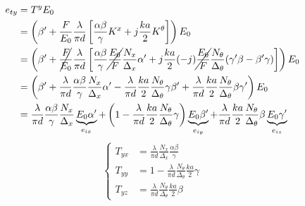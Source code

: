 \begin{align*}
    e_{ty} &= T^y E_0
    \\
    &=
    \left(
        \beta'
        +
        \frac{F}{E_0}
        \frac{\lambda}{\pi d}
        \left[
            \frac{\alpha \beta}{\gamma}
            K^x
            +
            j
            \frac{ka}{2}
            K^\theta
        \right]
    \right)
    E_0
    \\
    &=
    \left(
        \beta'
        +
        \cancel{\frac{F}{E_0}}
        \frac{\lambda}{\pi d}
        \left[
            \frac{\alpha \beta}{\gamma}
            \cancel{\frac{E_0}{F}}
            \frac{N_x}{\Delta_x}
            \alpha'
            +
            j
            \frac{ka}{2}
            (-j)
            \cancel{\frac{E_0}{F}}
            \frac{N_\theta}{\Delta_\theta}
            (\gamma' \beta - \beta' \gamma)
        \right]
    \right)
    E_0
    \\
    &=
    \left(
        \beta'
        +
        \frac{\lambda}{\pi d}
        \frac{\alpha \beta}{\gamma}
        \frac{N_x}{\Delta_x}
        \alpha'
        -
        \frac{\lambda}{\pi d}
        \frac{ka}{2}
        \frac{N_\theta}{\Delta_\theta}
        \gamma
        \beta'
        +
        \frac{\lambda}{\pi d}
        \frac{ka}{2}
        \frac{N_\theta}{\Delta_\theta}
        \beta
        \gamma'
    \right)
    E_0
    \\
    &=
    \frac{\lambda}{\pi d}
    \frac{\alpha \beta}{\gamma}
    \frac{N_x}{\Delta_x}
    \underbrace{E_0 \alpha'}_{e_{ix}}
    +
    \left(
        1
        -
        \frac{\lambda}{\pi d}
        \frac{ka}{2}
        \frac{N_\theta}{\Delta_\theta}
        \gamma
    \right)
    \underbrace{E_0 \beta'}_{e_{iy}}
    +
    \frac{\lambda}{\pi d}
    \frac{ka}{2}
    \frac{N_\theta}{\Delta_\theta}
    \beta
    \underbrace{E_0 \gamma'}_{e_{iz}}
\end{align*}
\begin{equation}
    \left\lbrace
    \begin{aligned}
        T_{yx}
        &= \frac{\lambda}{\pi d}
           \frac{N_x}{\Delta_x}
           \frac{\alpha \beta}{\gamma}
        \\
        T_{yy}
        &= 1
           -
           \frac{\lambda}{\pi d}
           \frac{N_\theta}{\Delta_\theta}
           \frac{ka}{2}
           \gamma
        \\
        T_{yz}
        &= \frac{\lambda}{\pi d}
           \frac{N_\theta}{\Delta_\theta}
           \frac{ka}{2}
           \beta
    \end{aligned}
    \right.
\end{equation}

